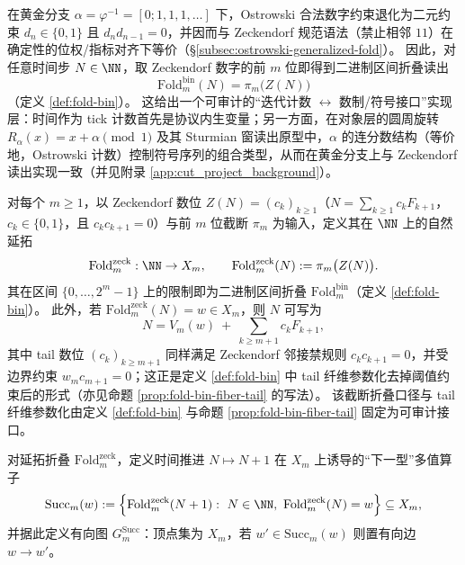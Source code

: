 \begin{enumerate}
  \begin{corollary}\label{cor:terminal-ostrowski-zeckendorf-binfold}
  在黄金分支 \(\alpha=\varphi^{-1}=[0;1,1,1,\dots]\) 下，Ostrowski 合法数字约束退化为二元约束 \(d_n\in\{0,1\}\) 且 \(d_n d_{n-1}=0\)，并因而与 Zeckendorf 规范语法（禁止相邻 \(11\)）在确定性的位权/指标对齐下等价（\S\ref{subsec:ostrowski-generalized-fold}）。
  因此，对任意时间步 \(N\in\NN\)，取 Zeckendorf 数字的前 \(m\) 位即得到二进制区间折叠读出
  \[
  \mathrm{Fold}^{\mathrm{bin}}_m(N)=\pi_m\bigl(Z(N)\bigr)
  \]
  （定义 \ref{def:fold-bin}）。
  这给出一个可审计的“迭代计数 \(\leftrightarrow\) 数制/符号接口”实现层：时间作为 tick 计数首先是协议内生变量；另一方面，在对象层的圆周旋转 \(R_\alpha(x)=x+\alpha\pmod 1\) 及其 Sturmian 窗读出原型中，\(\alpha\) 的连分数结构（等价地，Ostrowski 计数）控制符号序列的组合类型，从而在黄金分支上与 Zeckendorf 读出实现一致（并见附录 \ref{app:cut_project_background}）。
  \end{corollary}

  \begin{definition}\label{def:terminal-fold-zeck-extension}
  对每个 \(m\ge 1\)，以 Zeckendorf 数位 \(Z(N)=(c_k)_{k\ge 1}\)（\(N=\sum_{k\ge 1}c_kF_{k+1}\)，\(c_k\in\{0,1\}\)，且 \(c_kc_{k+1}=0\)）与前 \(m\) 位截断 \(\pi_m\) 为输入，定义其在 \(\NN\) 上的自然延拓
  \[
  \mathrm{Fold}^{\mathrm{zeck}}_m:\NN\to X_m,\qquad
  \mathrm{Fold}^{\mathrm{zeck}}_m(N):=\pi_m\bigl(Z(N)\bigr).
  \]
  其在区间 \(\{0,\dots,2^m-1\}\) 上的限制即为二进制区间折叠 \(\mathrm{Fold}^{\mathrm{bin}}_m\)（定义 \ref{def:fold-bin}）。
  此外，若 \(\mathrm{Fold}^{\mathrm{zeck}}_m(N)=w\in X_m\)，则 \(N\) 可写为
  \[
  N=V_m(w)\ +\ \sum_{k\ge m+1} c_kF_{k+1},
  \]
  其中 tail 数位 \((c_k)_{k\ge m+1}\) 同样满足 Zeckendorf 邻接禁规则 \(c_kc_{k+1}=0\)，并受边界约束 \(w_m c_{m+1}=0\)；这正是定义 \ref{def:fold-bin} 中 tail 纤维参数化去掉阈值约束后的形式（亦见命题 \ref{prop:fold-bin-fiber-tail} 的写法）。
  该截断折叠口径与 tail 纤维参数化由定义 \ref{def:fold-bin} 与命题 \ref{prop:fold-bin-fiber-tail} 固定为可审计接口。
  \end{definition}

  \begin{definition}[下一型多值算子与时间因子图]\label{def:terminal-succ-m}
  对延拓折叠 \(\mathrm{Fold}^{\mathrm{zeck}}_m\)，定义时间推进 \(N\mapsto N+1\) 在 \(X_m\) 上诱导的“下一型”多值算子
  \[
  \mathrm{Succ}_m(w):=\Bigl\{\mathrm{Fold}^{\mathrm{zeck}}_m(N+1):\ N\in\NN,\ \mathrm{Fold}^{\mathrm{zeck}}_m(N)=w\Bigr\}\subseteq X_m,
  \]
  并据此定义有向图 \(G^{\mathrm{Succ}}_m\)：顶点集为 \(X_m\)，若 \(w'\in\mathrm{Succ}_m(w)\) 则置有向边 \(w\to w'\)。
  \end{definition}


\end{enumerate}
